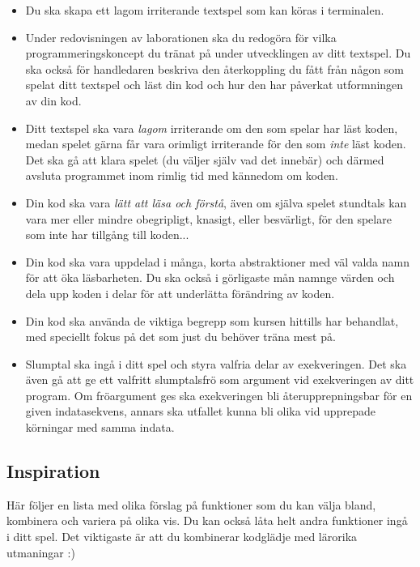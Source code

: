 \begin{itemize}
\item Du ska skapa ett lagom irriterande textspel som kan köras i terminalen. 

\item Under redovisningen av laborationen ska du redogöra för vilka programmeringskoncept du tränat på under utvecklingen av ditt textspel. Du ska också för handledaren beskriva den återkoppling du fått från någon som spelat ditt textspel och läst din kod och hur den har påverkat utformningen av din kod. 

\item Ditt textspel ska vara \emph{lagom} irriterande om den som spelar har läst koden, medan spelet gärna får vara orimligt irriterande för den som \emph{inte} läst koden. Det ska gå att klara spelet (du väljer själv vad det innebär) och därmed avsluta programmet inom rimlig tid med kännedom om koden.

\item Din kod ska vara \textit{lätt att läsa och förstå}, även om själva spelet stundtals kan vara mer eller mindre obegripligt, knasigt, eller besvärligt, för den spelare som inte har tillgång till koden...

\item Din kod ska vara uppdelad i många, korta abstraktioner med väl valda namn för att öka läsbarheten. Du ska också i görligaste mån namnge värden och dela upp koden i delar för att underlätta förändring av koden.

\item Din kod ska använda de viktiga begrepp som kursen hittills har behandlat, med speciellt fokus på det som just du behöver träna mest på. 

\item Slumptal ska ingå i ditt spel och styra valfria delar av exekveringen. Det ska även gå att ge ett valfritt slumptalsfrö som argument vid exekveringen av ditt program. Om fröargument ges ska exekveringen bli återupprepningsbar för en given indatasekvens, annars ska utfallet kunna bli olika vid upprepade körningar med samma indata.
\end{itemize}

\subsection{Inspiration}

Här följer en lista med olika förslag på funktioner som du kan välja bland, kombinera och variera på olika vis. Du kan också låta helt andra funktioner ingå i ditt spel. Det viktigaste är att du kombinerar kodglädje med lärorika utmaningar :)

